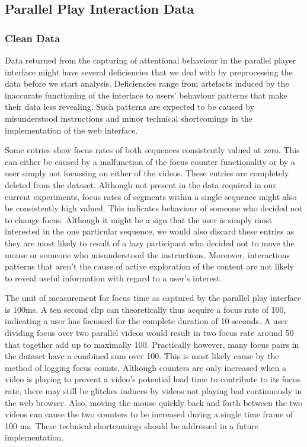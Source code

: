 \subsection{Parallel Play Interaction Data} %
\label{sub:parallel_play_interaction_data}

\subsubsection{Clean Data} %

Data returned from the capturing of attentional behaviour in the parallel player interface might have several deficiencies that we deal with by preprocessing the data before we start analysis. Deficiencies range from artefacts induced by the inaccurate functioning of the interface to users' behaviour patterns that make their data less revealing. Such patterns are expected to be caused by misunderstood instructions and minor technical shortcomings in the implementation of the web interface.

Some entries show focus rates of both sequences consistently valued at zero. This can either be caused by a malfunction of the focus counter functionality or by a user simply not focussing on either of the videos. These entries are completely deleted from the dataset. Although not present in the data required in our current experiments, focus rates of segments within a single sequence might also be consistently high valued. This indicates behaviour of someone who decided not to change focus. Although it might be a sign that the user is simply most interested in the one particular sequence, we would also discard these entries as they are most likely to result of a lazy participant who decided not to move the mouse or someone who misunderstood the instructions. Moreover, interactions patterns that aren't the cause of active exploration of the content are not likely to reveal useful information with regard to a user's interest.

The unit of measurement for focus time as captured by the parallel play interface is 100ms. A ten second clip can theoretically thus acquire a focus rate of 100, indicating a user has focussed for the complete duration of 10-seconds. A user dividing focus over two parallel videos would result in two focus rate around 50 that together add up to maximally 100. Practically however, many focus pairs in the dataset have a combined sum over 100. This is most likely cause by the method of logging focus counts. Although counters are only increased when a video is playing to prevent a video's potential load time to contribute to its focus rate, there may still be glitches induces by videos not playing bad continuously in the web browser. Also, moving the mouse quickly back and forth between the two videos can cause the two counters to be increased during a single time frame of 100 ms. These technical shortcomings should be addressed in a future implementation. 

